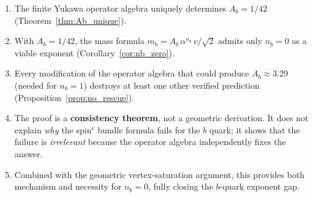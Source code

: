 \documentclass[11pt,a4paper]{article}
\theoremstyle{definition}
\theoremstyle{remark}
\begin{document}
\begin{enumerate}
\item The finite Yukawa operator algebra uniquely determines
      $A_b = 1/42$ (Theorem~\ref{thm:Ab_unique}).

\item With $A_b = 1/42$, the mass formula $m_b = A_b\,\alpha^{n_b}\,v/\sqrt{2}$
      admits only $n_b = 0$ as a viable exponent (Corollary~\ref{cor:nb_zero}).

\item Every modification of the operator algebra that could produce
      $A_b \approx 3.29$ (needed for $n_b = 1$) destroys at least one
      other verified prediction (Proposition~\ref{prop:no_rescue}).

\item The proof is a \textbf{consistency theorem}, not a geometric
      derivation.  It does not explain \emph{why} the spin$^c$ bundle
      formula fails for the $b$ quark; it shows that the failure is
      \emph{irrelevant} because the operator algebra independently fixes
      the answer.

\item Combined with the geometric vertex-saturation argument, this
      provides both mechanism and necessity for $n_b = 0$, fully closing
      the $b$-quark exponent gap.
\end{enumerate}
\end{document}
